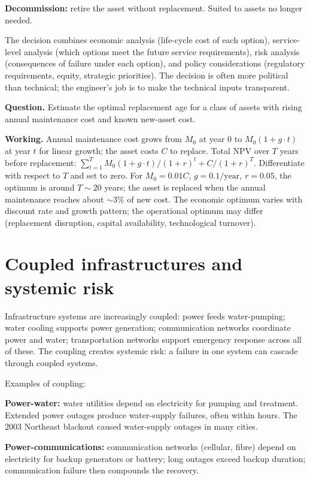 \textbf{Decommission:} retire the asset without replacement. Suited to assets no longer needed.

The decision combines economic analysis (life-cycle cost of each option), service-level analysis (which options meet the future service requirements), risk analysis (consequences of failure under each option), and policy considerations (regulatory requirements, equity, strategic priorities). The decision is often more political than technical; the engineer's job is to make the technical inputs transparent.

\begin{estimation}
\textbf{Question.} Estimate the optimal replacement age for a class of assets with rising annual maintenance cost and known new-asset cost.

\textbf{Working.} Annual maintenance cost grows from $M_0$ at year $0$ to $M_0(1 + g \cdot t)$ at year $t$ for linear growth; the asset costs $C$ to replace. Total NPV over $T$ years before replacement: $\sum_{t=1}^T M_0(1 + g \cdot t)/(1+r)^t + C/(1+r)^T$. Differentiate with respect to $T$ and set to zero. For $M_0 = 0.01C$, $g = 0.1/\text{year}$, $r = 0.05$, the optimum is around $T \sim 20$ years; the asset is replaced when the annual maintenance reaches about $\sim 3\%$ of new cost. The economic optimum varies with discount rate and growth pattern; the operational optimum may differ (replacement disruption, capital availability, technological turnover).
\end{estimation}

\section{Coupled infrastructures and systemic risk}

Infrastructure systems are increasingly coupled: power feeds water-pumping; water cooling supports power generation; communication networks coordinate power and water; transportation networks support emergency response across all of these. The coupling creates systemic risk: a failure in one system can cascade through coupled systems.

Examples of coupling:

\textbf{Power-water:} water utilities depend on electricity for pumping and treatment. Extended power outages produce water-supply failures, often within hours. The 2003 Northeast blackout caused water-supply outages in many cities.

\textbf{Power-communications:} communication networks (cellular, fibre) depend on electricity for backup generators or battery; long outages exceed backup duration; communication failure then compounds the recovery.

